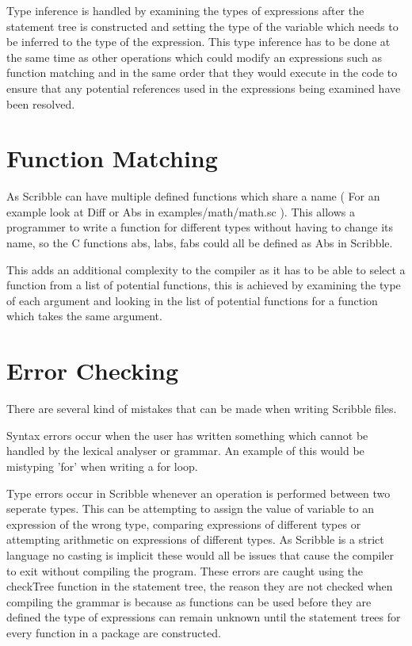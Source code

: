 \documentclass[]{final_report}
\begin{document}
Type inference is handled by examining the types of expressions after the statement tree is constructed and setting the type of the variable which needs to be inferred to the type of the expression. This type inference has to be done at the same time as other operations which could modify an expressions such as function matching and in the same order that they would execute in the code to ensure that any potential references used in the expressions being examined have been resolved.

\section{Function Matching}

As Scribble can have multiple defined functions which share a name ( For an example look at Diff or Abs in examples/math/math.sc ). This allows a programmer to write a function for different types without having to change its name, so the C functions abs, labs, fabs could all be defined as Abs in Scribble.

This adds an additional complexity to the compiler as it has to be able to select a function from a list of potential functions, this is achieved by examining the type of each argument and looking in the list of potential functions for a function which takes the same argument. 

\section{Error Checking}

There are several kind of mistakes that can be made when writing Scribble files. 

Syntax errors occur when the user has written something which cannot be handled by the lexical analyser or grammar. An example of this would be mistyping 'for' when writing a for loop. 

Type errors occur in Scribble whenever an operation is performed between two seperate types. This can be attempting to assign the value of variable to an expression of the wrong type, comparing expressions of different types or attempting arithmetic on expressions of different types. As Scribble is a strict language no casting is implicit these would all be issues that cause the compiler to exit without compiling the program. These errors are caught using the checkTree function in the statement tree, the reason they are not checked when compiling the grammar is because as functions can be used before they are defined the type of expressions can remain unknown until the statement trees for every function in a package are constructed.
\end{document}
